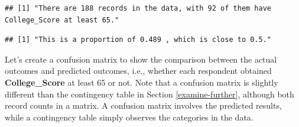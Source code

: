 \documentclass[
]{article}
\newenvironment{Shaded}{\begin{snugshade}}{\end{snugshade}}
\newcommand{\AttributeTok}[1]{\textcolor[rgb]{0.77,0.63,0.00}{#1}}
\newcommand{\CommentTok}[1]{\textcolor[rgb]{0.56,0.35,0.01}{\textit{#1}}}
\newcommand{\DecValTok}[1]{\textcolor[rgb]{0.00,0.00,0.81}{#1}}
\newcommand{\FloatTok}[1]{\textcolor[rgb]{0.00,0.00,0.81}{#1}}
\newcommand{\FunctionTok}[1]{\textcolor[rgb]{0.00,0.00,0.00}{#1}}
\newcommand{\NormalTok}[1]{#1}
\newcommand{\OtherTok}[1]{\textcolor[rgb]{0.56,0.35,0.01}{#1}}
\newcommand{\SpecialCharTok}[1]{\textcolor[rgb]{0.00,0.00,0.00}{#1}}
\newcommand{\StringTok}[1]{\textcolor[rgb]{0.31,0.60,0.02}{#1}}
\begin{document}
\begin{verbatim}
## [1] "There are 188 records in the data, with 92 of them have College_Score at least 65."
\end{verbatim}

\begin{Shaded}
\end{Shaded}

\begin{verbatim}
## [1] "This is a proportion of 0.489 , which is close to 0.5."
\end{verbatim}

Let's create a confusion matrix to show the comparison between the
actual outcomes and predicted outcomes, i.e., whether each respondent
obtained \textbf{College\_Score} at least 65 or not. Note that a
confusion matrix is slightly different than the contingency table in
Section \ref{examine-further}, although both record counts in a matrix.
A confusion matrix involves the predicted results, while a contingency
table simply observes the categories in the data.

\begin{Shaded}
\end{Shaded}
\end{document}
